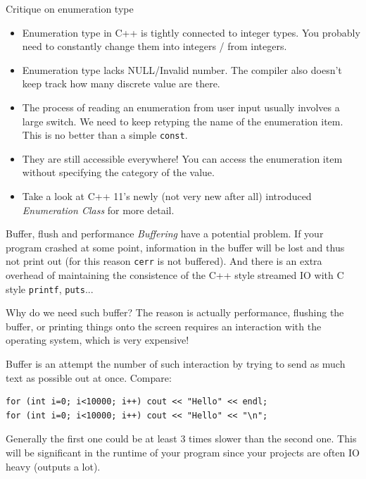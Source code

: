 \begin{frame}{Critique on enumeration type}
\begin{itemize}
	\item Enumeration type in C++ is tightly connected to integer types. You probably need to constantly change them into integers / from integers. 
	\item Enumeration type lacks NULL/Invalid number. The compiler also doesn't keep track how many discrete value are there. 
	\item The process of reading an enumeration from user input usually involves a large switch. We need to keep retyping the name of the enumeration item. This is no better than a simple \texttt{const}.
	\item They are still accessible everywhere! You can access the enumeration item without specifying the category of the value.
	\item Take a look at C++ 11's newly (not very new after all) introduced \textit{Enumeration Class} for more detail. 
\end{itemize}
\end{frame}

\begin{frame}[fragile]{Buffer, flush and performance}
\textit{Buffering} have a potential problem. If your program crashed at some point, information in the buffer will be lost and thus not print out (for this reason \texttt{cerr} is not buffered). And there is an extra overhead of maintaining the consistence of the C++ style streamed IO with C style \texttt{printf}, \texttt{puts}... 

Why do we need such buffer? The reason is actually performance, flushing the buffer, or printing things onto the screen requires an interaction with the operating system, which is very expensive!

Buffer is an attempt the number of such interaction by trying to send as much text as possible out at once. Compare:

\begin{verbatim}
for (int i=0; i<10000; i++) cout << "Hello" << endl;
for (int i=0; i<10000; i++) cout << "Hello" << "\n";
\end{verbatim}
Generally the first one could be at least 3 times slower than the second one. This will be significant in the runtime of your program since your projects are often IO heavy (outputs a lot).
\end{frame}

